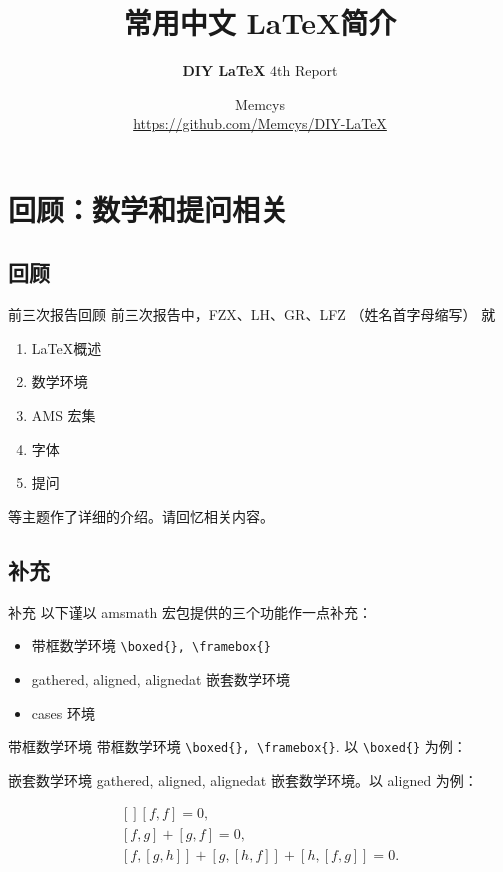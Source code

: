 \documentclass[final,aspectratio=32]{ctexbeamer}
\title{常用中文 \LaTeX 简介}
\subtitle{\textbf{DIY \LaTeX} $4$th Report}
\author[Memcys]{Memcys \\ \url{https://github.com/Memcys/DIY-LaTeX}}
\institute[UCAS]{University of Chinese Academy of Sciences}
\begin{document}
\frame{\titlepage}

\setcounter{section}{-1}

\section[回顾]{回顾：数学和提问相关}
\subsection{回顾}
\begin{frame}{前三次报告回顾}
前三次报告中，FZX、LH、GR、LFZ （姓名首字母缩写） 就
\begin{enumerate}
\item \LaTeX 概述
\item 数学环境
\item AMS 宏集
\item 字体
\item 提问
\end{enumerate}
等主题作了详细的介绍。请回忆相关内容。
\end{frame}

\subsection{补充}
\begin{frame}[fragile]{补充}
以下谨以 amsmath 宏包提供的三个功能作一点补充：
\begin{itemize}
  \item 带框数学环境 \verb|\boxed{}, \framebox{}|
  \item gathered, aligned, alignedat 嵌套数学环境
  \item cases 环境
\end{itemize}
\end{frame}

\begin{frame}[fragile]{带框数学环境}
带框数学环境 \verb|\boxed{}, \framebox{}|. 以 \verb|\boxed{}| 为例：
\begin{vertlst}

\boxed{\e^{\iu \theta} = \cos{\theta} + \iu \sin{\theta}}
\end{vertlst}
\end{frame}

\begin{frame}[fragile]{嵌套数学环境}
gathered, aligned, alignedat 嵌套数学环境。以 aligned 为例：
\begin{vertlst}
\footnotesize
\begin{equation}
\begin{gathered}[]
  [f, f] = 0, \\
  [f, g] + [g, f] = 0, \\
  [f, [g, h]] + [g, [h, f]] + [h, [f, g]] = 0.
\end{gathered}
\end{equation} 
\end{vertlst}
\end{frame}
\end{document}
